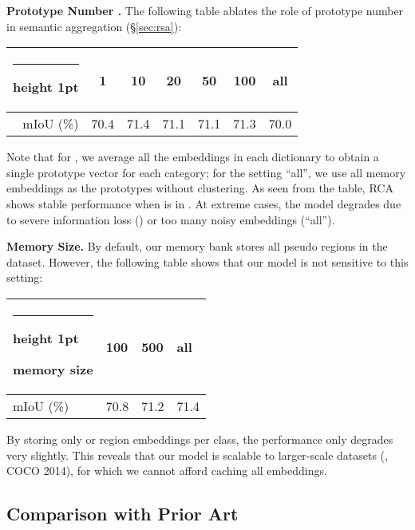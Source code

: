 \documentclass[10pt,twocolumn,letterpaper]{article}
\makeatletter
\newcommand{\thickhline}{\noalign {\ifnum 0=`}\fi \hrule height 1pt
	\futurelet \reserved@a \@xhline
}
\newcommand{\tablestyle}[2]{\setlength{\tabcolsep}{#1}\renewcommand{\arraystretch}{#2}\centering\footnotesize}
\makeatother
\begin{document}
\noindent\textbf{Prototype Number .} The following table ablates the role of prototype number  in semantic aggregation (\S\ref{sec:rsa}):
\vspace{-6pt}
\begin{table}[H]
	\small\centering
		\tablestyle{8pt}{1.05}
		\begin{tabular}{|r|cccccc|}
			\thickhline
                                   & 1  & 10 & 20 & 50 & 100 & all \\ \hline		 
			mIoU (\%)           			   & 70.4 & 71.4 & 71.1 & 71.1 & 71.3 & 70.0  \\ \hline		 	
	\end{tabular}
	\vspace{-10pt}
\end{table}
\noindent  Note that for , we  average all the embeddings in each dictionary to obtain a single prototype vector for each category; for the setting ``all'', we use all memory embeddings as the prototypes without clustering. As seen from the table, RCA shows stable performance when  is in . At extreme cases, the model degrades due to severe information loss () or too many noisy embeddings (``all'').






\noindent\textbf{Memory Size.} By default, our memory bank stores all pseudo regions in the  dataset. However, the following table shows that our model is not sensitive to this setting:
\vspace{-6pt}
\begin{table}[H]
	\small
	\centering	
	\tablestyle{1pt}{1.05}
	\begin{tabular}{|z{50}|x{55}x{55}x{55}|}
		\thickhline
memory size 
		& 100 & 500 & all  \\ \hline		 
		mIoU (\%)           						 
		& 70.8 & 71.2 & 71.4  \\ \hline		 
	\end{tabular}
	\vspace{-10pt}
\end{table}
\noindent By storing only  or  region embeddings per class, the performance only degrades very slightly. This reveals that our model is scalable to larger-scale datasets (\eg, COCO 2014), for which we cannot afford caching all embeddings.





\subsection{Comparison with Prior Art}
\end{document}
